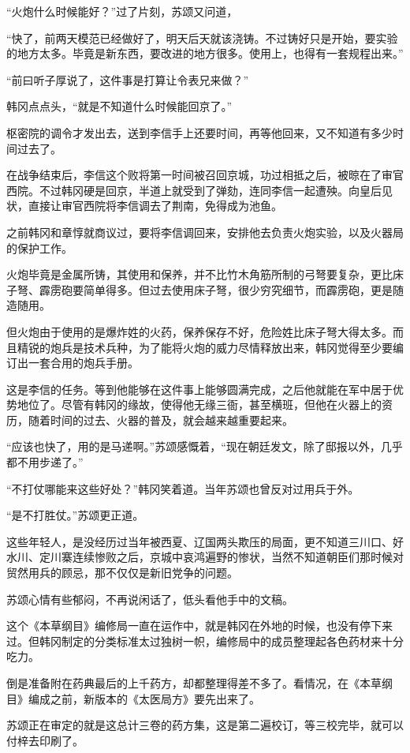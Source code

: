 “火炮什么时候能好？”过了片刻，苏颂又问道，

“快了，前两天模范已经做好了，明天后天就该浇铸。不过铸好只是开始，要实验的地方太多。毕竟是新东西，要改进的地方很多。使用上，也得有一套规程出来。”

“前曰听子厚说了，这件事是打算让令表兄来做？”

韩冈点点头，“就是不知道什么时候能回京了。”

枢密院的调令才发出去，送到李信手上还要时间，再等他回来，又不知道有多少时间过去了。

在战争结束后，李信这个败将第一时间被召回京城，功过相抵之后，被晾在了审官西院。不过韩冈硬是回京，半道上就受到了弹劾，连同李信一起遭殃。向皇后见状，直接让审官西院将李信调去了荆南，免得成为池鱼。

之前韩冈和章惇就商议过，要将李信调回来，安排他去负责火炮实验，以及火器局的保护工作。

火炮毕竟是金属所铸，其使用和保养，并不比竹木角筋所制的弓弩要复杂，更比床子弩、霹雳砲要简单得多。但过去使用床子弩，很少穷究细节，而霹雳砲，更是随造随用。

但火炮由于使用的是爆炸姓的火药，保养保存不好，危险姓比床子弩大得太多。而且精锐的炮兵是技术兵种，为了能将火炮的威力尽情释放出来，韩冈觉得至少要编订出一套合用的炮兵手册。

这是李信的任务。等到他能够在这件事上能够圆满完成，之后他就能在军中居于优势地位了。尽管有韩冈的缘故，使得他无缘三衙，甚至横班，但他在火器上的资历，随着时间的过去、火器的普及，就会越来越重要起来。

“应该也快了，用的是马递啊。”苏颂感慨着，“现在朝廷发文，除了邸报以外，几乎都不用步递了。”

“不打仗哪能来这些好处？”韩冈笑着道。当年苏颂也曾反对过用兵于外。

“是不打胜仗。”苏颂更正道。

这些年轻人，是没经历过当年被西夏、辽国两头欺压的局面，更不知道三川口、好水川、定川寨连续惨败之后，京城中哀鸿遍野的惨状，当然不知道朝臣们那时候对贸然用兵的顾忌，那不仅仅是新旧党争的问题。

苏颂心情有些郁闷，不再说闲话了，低头看他手中的文稿。

这个《本草纲目》编修局一直在运作中，就是韩冈在外地的时候，也没有停下来过。但韩冈制定的分类标准太过独树一帜，编修局中的成员整理起各色药材来十分吃力。

倒是准备附在药典最后的上千药方，却都整理得差不多了。看情况，在《本草纲目》编成之前，新版本的《太医局方》要先出来了。

苏颂正在审定的就是这总计三卷的药方集，这是第二遍校订，等三校完毕，就可以付梓去印刷了。

